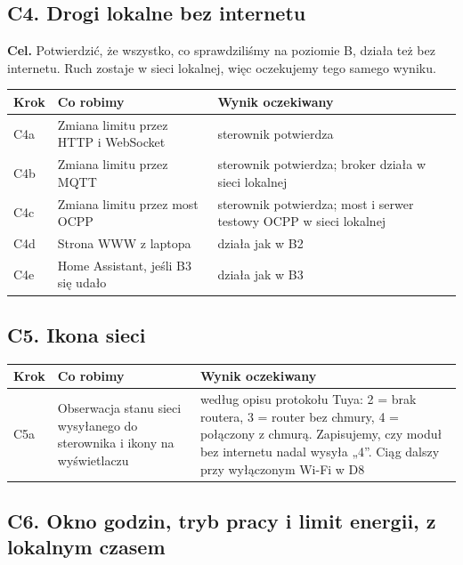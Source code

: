 \documentclass[11pt,a4paper]{article}
\begin{document}
\subsection{C4. Drogi lokalne bez internetu}

\textbf{Cel.} Potwierdzić, że wszystko, co sprawdziliśmy na poziomie B, działa też bez internetu. Ruch zostaje w sieci lokalnej, więc oczekujemy tego samego wyniku.


\begin{longtable}{>{\raggedright\arraybackslash}p{3.00cm}>{\raggedright\arraybackslash}p{5.57cm}>{\raggedright\arraybackslash}p{6.71cm}}
\toprule
\rowcolor{apteallight}\textbf{Krok} & \textbf{Co robimy} & \textbf{Wynik oczekiwany} \\
\midrule\endhead
\bottomrule\endfoot
C4a & Zmiana limitu przez HTTP i WebSocket & sterownik potwierdza \\
C4b & Zmiana limitu przez MQTT & sterownik potwierdza; broker działa w sieci lokalnej \\
C4c & Zmiana limitu przez most OCPP & sterownik potwierdza; most i serwer testowy OCPP w sieci lokalnej \\
C4d & Strona WWW z laptopa & działa jak w B2 \\
C4e & Home Assistant, jeśli B3 się udało & działa jak w B3 \\
\end{longtable}

\subsection{C5. Ikona sieci}

\begin{longtable}{>{\raggedright\arraybackslash}p{3.00cm}>{\raggedright\arraybackslash}p{4.91cm}>{\raggedright\arraybackslash}p{7.37cm}}
\toprule
\rowcolor{apteallight}\textbf{Krok} & \textbf{Co robimy} & \textbf{Wynik oczekiwany} \\
\midrule\endhead
\bottomrule\endfoot
C5a & Obserwacja stanu sieci wysyłanego do sterownika i ikony na wyświetlaczu & według opisu protokołu Tuya: 2 = brak routera, 3 = router bez chmury, 4 = połączony z chmurą. Zapisujemy, czy moduł bez internetu nadal wysyła „4”. Ciąg dalszy przy wyłączonym Wi-Fi w D8 \\
\end{longtable}

\subsection{C6. Okno godzin, tryb pracy i limit energii, z lokalnym czasem}
\end{document}
